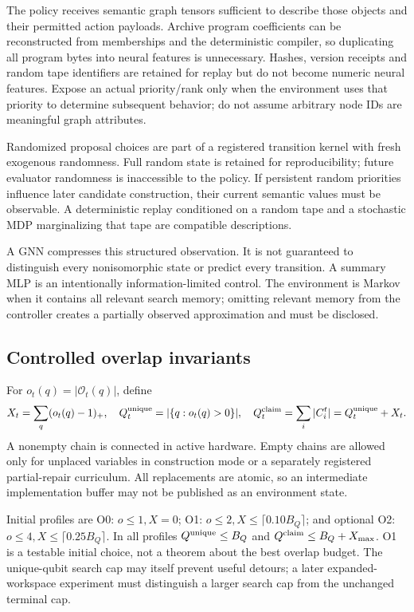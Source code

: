 \documentclass[11pt,a4paper]{article}
\theoremstyle{definition}\newtheorem{definition}[proposition]{Definition}
\begin{document}
The policy receives semantic graph tensors sufficient to describe those objects and their permitted action payloads. Archive program coefficients can be reconstructed from memberships and the deterministic compiler, so duplicating all program bytes into neural features is unnecessary. Hashes, version receipts and random tape identifiers are retained for replay but do not become numeric neural features. Expose an actual priority/rank only when the environment uses that priority to determine subsequent behavior; do not assume arbitrary node IDs are meaningful graph attributes.

Randomized proposal choices are part of a registered transition kernel with fresh exogenous randomness. Full random state is retained for reproducibility; future evaluator randomness is inaccessible to the policy. If persistent random priorities influence later candidate construction, their current semantic values must be observable. A deterministic replay conditioned on a random tape and a stochastic MDP marginalizing that tape are compatible descriptions.

A GNN compresses this structured observation. It is not guaranteed to distinguish every nonisomorphic state or predict every transition. A summary MLP is an intentionally information-limited control. The environment is Markov when it contains all relevant search memory; omitting relevant memory from the controller creates a partially observed approximation and must be disclosed.

\subsection{Controlled overlap invariants}
For $o_t(q)=|\mathcal O_t(q)|$, define
\begin{equation}
X_t=\sum_q(o_t(q)-1)_+,\quad
Q_t^{\rm unique}=|\{q:o_t(q)>0\}|,\quad
Q_t^{\rm claim}=\sum_i|C_i^t|=Q_t^{\rm unique}+X_t.
\end{equation}
A nonempty chain is connected in active hardware. Empty chains are allowed only for unplaced variables in construction mode or a separately registered partial-repair curriculum. All replacements are atomic, so an intermediate implementation buffer may not be published as an environment state.

Initial profiles are O0: $o\le1,X=0$; O1: $o\le2,X\le\lceil0.10B_Q\rceil$; and optional O2: $o\le4,X\le\lceil0.25B_Q\rceil$. In all profiles $Q^{\rm unique}\le B_Q$ and $Q^{\rm claim}\le B_Q+X_{\max}$. O1 is a testable initial choice, not a theorem about the best overlap budget. The unique-qubit search cap may itself prevent useful detours; a later expanded-workspace experiment must distinguish a larger search cap from the unchanged terminal cap.
\end{document}
